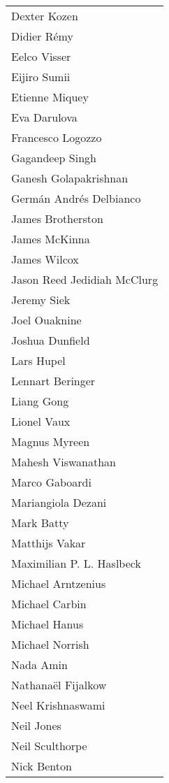 \begin{tabular}[t]{@{}p{\namewidth}}
Dexter Kozen \\
Didier R\'{e}my \\
Eelco Visser \\
Eijiro Sumii \\
Etienne Miquey \\
Eva Darulova \\
Francesco Logozzo \\
Gagandeep Singh \\
Ganesh Golapakrishnan \\
Germ\'{a}n Andr\'{e}s Delbianco \\
James Brotherston \\
James McKinna \\
James Wilcox \\
Jason Reed 
Jedidiah McClurg \\
Jeremy Siek \\
Joel Ouaknine \\
Joshua Dunfield \\
Lars Hupel \\
Lennart Beringer \\
Liang Gong \\
Lionel Vaux \\
Magnus Myreen \\
Mahesh Viswanathan \\
Marco Gaboardi \\
Mariangiola Dezani \\
Mark Batty \\
Matthijs Vakar \\
Maximilian P. L. Haslbeck \\
Michael Arntzenius \\
Michael Carbin \\
Michael Hanus \\
Michael Norrish \\
Nada Amin \\
Nathana\"{e}l Fijalkow \\
Neel Krishnaswami \\
Neil Jones \\
Neil Sculthorpe \\
Nick Benton 
\end{tabular}
